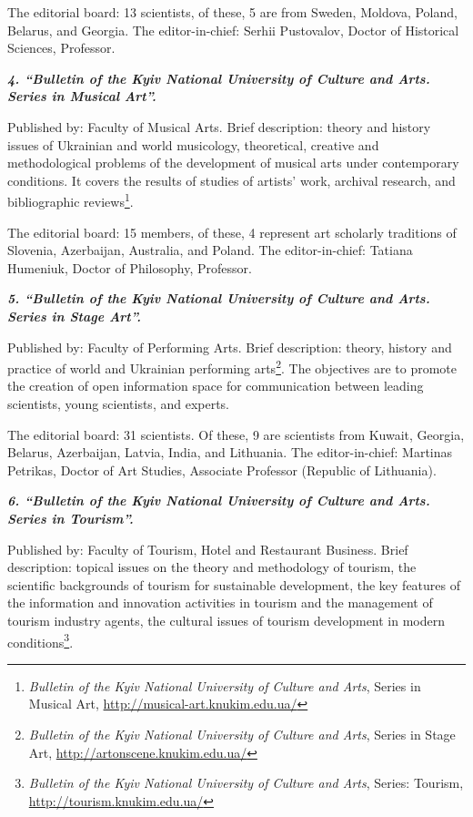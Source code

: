 \documentclass[a4paper,
fontsize=11pt,
oneside,
numbers=noperiodatend,
parskip=half-,
bibliography=totoc,
final
]{scrartcl}
\begin{document}
The editorial board: 13 scientists, of these, 5 are from Sweden,
Moldova, Poland, Belarus, and Georgia. The editor-in-chief: Serhii
Pustovalov, Doctor of Historical Sciences, Professor.

\textbf{\emph{4. \enquote{Bulletin of the Kyiv National University of
Culture and Arts. Series in Musical Art}.}}

Published by: Faculty of Musical Arts. Brief description: theory and
history issues of Ukrainian and world musicology, theoretical, creative
and methodological problems of the development of musical arts under
contemporary conditions. It covers the results of studies of artists'
work, archival research, and bibliographic reviews\footnote{\emph{Bulletin
  of the Kyiv National University of Culture and Arts}, Series in
  Musical Art, \url{http://musical-art.knukim.edu.ua/}}.

The editorial board: 15 members, of these, 4 represent art scholarly
traditions of Slovenia, Azerbaijan, Australia, and Poland. The
editor-in-chief: Tatiana Humeniuk, Doctor of Philosophy, Professor.

\textbf{\emph{5. \enquote{Bulletin of the Kyiv National University of
Culture and Arts. Series in Stage Art}.}}

Published by: Faculty of Performing Arts. Brief description: theory,
history and practice of world and Ukrainian performing arts\footnote{\emph{Bulletin
  of the Kyiv National University of Culture and Arts}, Series in Stage
  Art, \url{http://artonscene.knukim.edu.ua/}}. The objectives are to
promote the creation of open information space for communication between
leading scientists, young scientists, and experts.

The editorial board: 31 scientists. Of these, 9 are scientists from
Kuwait, Georgia, Belarus, Azerbaijan, Latvia, India, and Lithuania. The
editor-in-chief: Martinas Petrikas, Doctor of Art Studies, Associate
Professor (Republic of Lithuania).

\textbf{\emph{6. \enquote{Bulletin of the Kyiv National University of
Culture and Arts. Series in Tourism}.}}

Published by: Faculty of Tourism, Hotel and Restaurant Business. Brief
description: topical issues on the theory and methodology of tourism,
the scientific backgrounds of tourism for sustainable development, the
key features of the information and innovation activities in tourism and
the management of tourism industry agents, the cultural issues of
tourism development in modern conditions\footnote{\emph{Bulletin of the
  Kyiv National University of Culture and Arts}, Series: Tourism,
  \url{http://tourism.knukim.edu.ua/}}.
\end{document}
